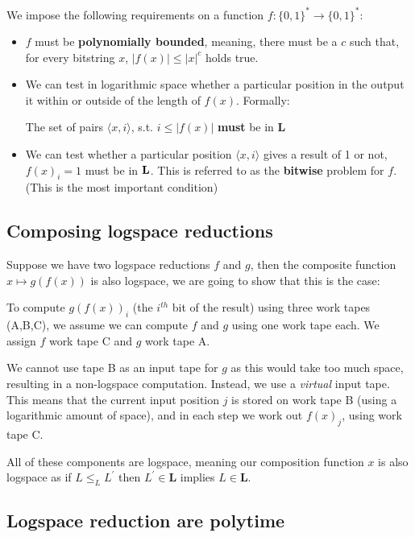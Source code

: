 \documentclass{article}
\begin{document}
We impose the following requirements on a function $f : \{ 0,1 \} ^{*} \rightarrow \{ 0,1 \} ^{*}$:

\begin{itemize}
  \item $f$ must be \textbf{polynomially bounded}, meaning, there must be a $c$ such that, for every bitstring $x$, $|f(x)| \leq |x|^{c}$ holds true.
  \item We can test in logarithmic space whether a particular position in the output it within or outside of the length of $f(x)$. Formally:

        The set of pairs $\langle x,i \rangle $, s.t. $i\leq |f(x)|$ \textbf{must} be in $\mathbf{L}  $
  \item We can test whether a particular position $\langle x,i \rangle $ gives a result of 1 or not, $f(x)_{i} = 1$ must be in $\bf L$. This is referred to as the \textbf{bitwise} problem for $f$. (This is the most important condition)
\end{itemize}

\subsection{Composing logspace reductions}
\label{subsec:ls-composing}

Suppose we have two logspace reductions $f$ and $g$, then the composite function $x\mapsto g(f(x))$ is also logspace, we are going to show that this is the case:

To compute $g(f(x))_{i}$ (the $i^{th}$ bit of the result) using three work tapes (A,B,C), we assume we can compute $f$ and $g$ using one work tape each. We assign $f$ work tape C and $g$ work tape A.

We cannot use tape B as an input tape for $g$ as this would take too much space, resulting in a non-logspace computation. Instead, we use a \textit{virtual} input tape. This means that the current input position $j$ is stored on work tape B (using a logarithmic amount of space), and in each step we work out $f(x)_{j}$, using work tape C.

All of these components are logspace, meaning our composition function $x$ is also logspace as if $L \leq_{L} L^{\prime}$ then $L^{\prime}\in \mathbf{L} $ implies $L \in \mathbf{L} $.

\subsection{Logspace reduction are polytime}
\end{document}
